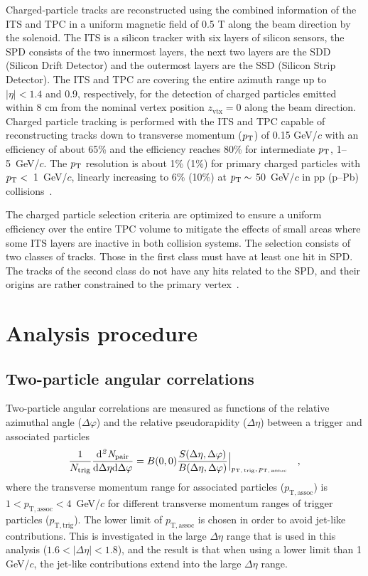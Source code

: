 Charged-particle tracks are reconstructed using the combined information of the ITS and TPC in a uniform magnetic field of 0.5 T along the beam direction by the solenoid. The ITS is a silicon tracker with six layers of silicon sensors, the SPD consists of the two innermost layers, the next two layers are the SDD (Silicon Drift Detector) and the outermost layers are the SSD (Silicon Strip Detector). The ITS and TPC are covering the entire azimuth range up to $|\eta|<1.4$ and 0.9, respectively, for the detection of charged particles emitted within 8 cm from the nominal vertex position $z_\mathrm{vtx}=0$ along the beam direction. Charged particle tracking is performed with the ITS and TPC capable of reconstructing tracks down to transverse momentum ($p_\mathrm{T}$) of 0.15 GeV/$c$ with an efficiency of about 65\% and the efficiency reaches 80\% for intermediate $p_\mathrm{T}$, 1--5~GeV/$c$. The $p_\mathrm{T}$ resolution is about 1\% (1\%) for primary charged particles with $p_\mathrm{T}<$~1~GeV/$c$, linearly increasing to 6\% (10\%) at $p_\mathrm{T}\sim$ 50~GeV/$c$ in pp (p--Pb) collisions~\cite{ALICE:2018vuu}. 

The charged particle selection criteria are optimized to ensure a uniform efficiency over the entire TPC volume to mitigate the effects of small areas where some ITS layers are inactive in both collision systems. The selection consists of two classes of tracks. Those in the first class must have at least one hit in SPD. The tracks of the second class do not have any hits related to the SPD, and their origins are rather constrained to the primary vertex~\cite{ALICE:2012eyl}. 

\section{Analysis procedure}
\label{sec:ana}
\subsection{Two-particle angular correlations}
Two-particle angular correlations are measured as functions of the relative azimuthal angle ($\Delta\varphi$) and the relative pseudorapidity ($\Delta\eta$) between a trigger and associated particles
\begin{eqnarray}
\frac{1}{N_{\rm{trig}}} \frac{ \rm{d}\it{}^{2} N_{\rm{pair}} }{ \rm{d} \Delta\eta \rm{d}\Delta\varphi} = B(0, 0)\frac{S(\Delta\eta, \Delta\varphi)}{B(\Delta\eta, \Delta\varphi)}  \Big\lvert_{p_\mathrm{T,\,trig},\,p_\mathrm{T,\,assoc}}\quad , 
\label{eq:corrfunction}
\end{eqnarray}
where the transverse momentum range for associated particles ($p_\mathrm{T,assoc}$) is $1<p_\mathrm{T,assoc}<4$~GeV/$c$ for different transverse momentum ranges of trigger particles ($p_\mathrm{T,trig}$).
The lower limit of $p_\mathrm{T,assoc}$ is chosen in order to avoid jet-like contributions. 
This is investigated in the large $\Delta\eta$ range that is used in this analysis ($1.6<|\Delta\eta|<1.8$), and the result is that when using a lower limit than 1 GeV/$c$, the jet-like contributions extend into the large $\Delta\eta$ range.

